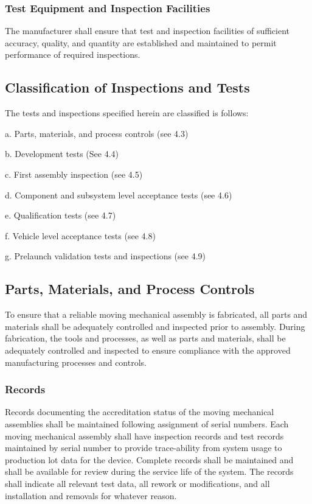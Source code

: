 \documentclass[12pt]{article}
\begin{document}
\subsubsection{Test Equipment and Inspection Facilities} %
The manufacturer shall ensure that test and inspection facilities of sufficient accuracy, quality, and quantity are established and maintained to permit performance of required inspections.

\subsection{Classification of Inspections and Tests} %
The tests and inspections specified herein are classified is follows:

a. Parts, materials, and process controls (see 4.3) 

b. Development tests (See 4.4)

c. First assembly inspection (see 4.5)

d. Component and subsystem level acceptance tests (see 4.6)

e. Qualification tests (see 4.7)

f. Vehicle level acceptance tests (see 4.8)

g. Prelaunch validation tests and inspections (see 4.9)

\subsection{Parts, Materials, and Process Controls} %
To ensure that a reliable moving mechanical assembly is fabricated, all parts and materials shall be adequately controlled and inspected prior to assembly. 
During fabrication, the tools and processes, as well as parts and materials, shall be adequately controlled and inspected to ensure compliance with the approved manufacturing processes and controls.

\subsubsection{Records} %
Records documenting the accreditation status of the moving mechanical assemblies shall be maintained following assignment of serial numbers. 
Each moving mechanical assembly shall have inspection records and test records maintained by serial number to provide trace-ability from system usage to production lot data for the device. 
Complete records shall be maintained and shall be available for review during the service life of the system. 
The records shall indicate all relevant test data, all rework or modifications, and all installation and removals for whatever reason.
\end{document}
